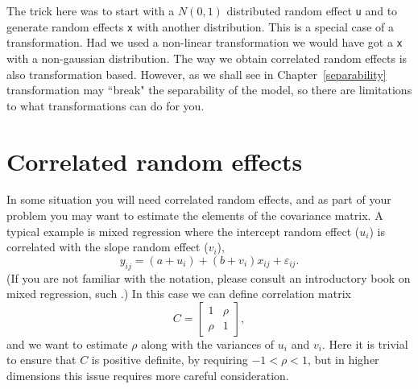 \documentclass[12pt,letter,reqno]{book}
\begin{document}
The trick here was to start with a $N(0,1)$ distributed random effect \texttt{u} and to generate random
effects \texttt{x} with another distribution. This is a special case of a transformation. 
Had we used a non-linear transformation we would have
got a \texttt{x} with a non-gaussian distribution. The way we obtain correlated random
effects is also transformation based. However, as we shall see in Chapter~\ref{separability} transformation
may ``break" the separability of the model, so there are limitations to what transformations can do for you.


\section{Correlated random effects\label{sec:correlated}} 
In some situation you will need correlated random effects, and as part of your problem
you may want to estimate the elements of the covariance matrix. A typical example is mixed
regression where the intercept random effect ($u_{i}$) is correlated with the slope random effect ($v_{i}$),
\[
  y_{ij}=(a+u_{i})+\left(b+v_{i}\right)x_{ij}+\varepsilon_{ij}.
\]
(If you are not familiar with the notation, please consult an introductory book on mixed regression, such 
.) In this case we can define correlation matrix
\[
 C=\left[\begin{array}{cc}
 1 & \rho\\
 \rho & 1\end{array}\right],
\]
and we want to estimate $\rho$ along with the variances of $u_{i}$ and $v_{i}$.
Here it is trivial to ensure that $C$ is positive definite, by requiring $-1<\rho<1$, but in higher dimensions
this issue requires more careful consideration. 
 
\end{document}
